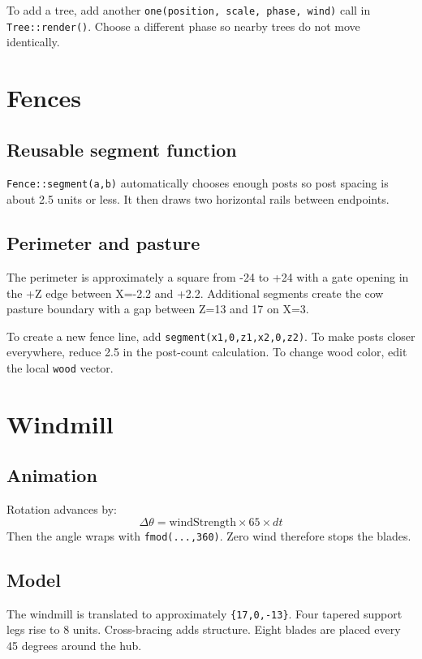 \documentclass[11pt,a4paper,openany]{book}
\newcommand{\code}[1]{\texttt{#1}}
\begin{document}
\begin{editbox}
	To add a tree, add another \code{one(position, scale, phase, wind)} call in \code{Tree::render()}. Choose a different phase so nearby trees do not move identically.
\end{editbox}

\chapter{Fences}
\section{Reusable segment function}
\code{Fence::segment(a,b)} automatically chooses enough posts so post spacing is about 2.5 units or less. It then draws two horizontal rails between endpoints.

\section{Perimeter and pasture}
The perimeter is approximately a square from -24 to +24 with a gate opening in the +Z edge between X=-2.2 and +2.2. Additional segments create the cow pasture boundary with a gap between Z=13 and 17 on X=3.

\begin{editbox}
	To create a new fence line, add \code{segment({x1,0,z1},{x2,0,z2})}. To make posts closer everywhere, reduce 2.5 in the post-count calculation. To change wood color, edit the local \code{wood} vector.
\end{editbox}

\chapter{Windmill}
\section{Animation}
Rotation advances by:
\[
	\Delta \theta = \text{windStrength}\times65\times dt
\]
Then the angle wraps with \code{fmod(...,360)}. Zero wind therefore stops the blades.

\section{Model}
The windmill is translated to approximately \code{\{17,0,-13\}}. Four tapered support legs rise to 8 units. Cross-bracing adds structure. Eight blades are placed every 45 degrees around the hub.
\end{document}

